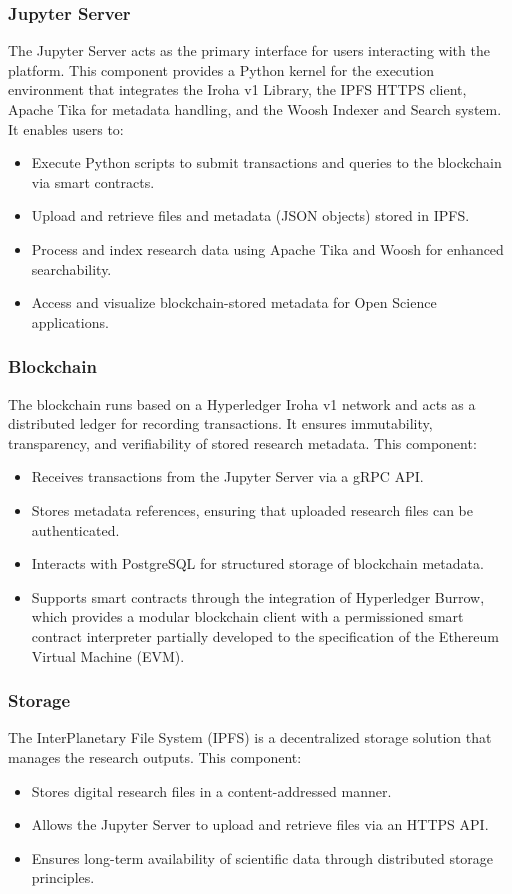 \documentclass[final]{rc-book-2.14}
\begin{document}
\subsubsection{Jupyter Server}
The Jupyter Server acts as the primary interface for users interacting with the platform. This component provides a Python kernel for the execution environment that integrates the Iroha v1 Library, the IPFS HTTPS client, Apache Tika for metadata handling, and the Woosh Indexer and Search system. It enables users to:

\begin{itemize}
    \item Execute Python scripts to submit transactions and queries to the blockchain via smart contracts.
    \item Upload and retrieve files and metadata (JSON objects) stored in IPFS.
    \item Process and index research data using Apache Tika and Woosh for enhanced searchability.
    \item Access and visualize blockchain-stored metadata for Open Science applications.
\end{itemize}

\subsubsection{Blockchain}
The blockchain runs based on a Hyperledger Iroha v1 network and acts as a distributed ledger for recording transactions. It ensures immutability, transparency, and verifiability of stored research metadata. This component:
\begin{itemize}
    \item Receives transactions from the Jupyter Server via a gRPC API.
    \item Stores metadata references, ensuring that uploaded research files can be authenticated.
    \item Interacts with PostgreSQL for structured storage of blockchain metadata.
    \item Supports smart contracts through the integration of Hyperledger Burrow, which provides a modular blockchain client with a permissioned smart contract interpreter partially developed to the specification of the Ethereum Virtual Machine (EVM).

\end{itemize}

\subsubsection{Storage}
The InterPlanetary File System (IPFS) is a decentralized storage solution that manages the research outputs. This component:
\begin{itemize}
    \item Stores digital research files in a content-addressed manner.
    \item Allows the Jupyter Server to upload and retrieve files via an HTTPS API.
    \item Ensures long-term availability of scientific data through distributed storage principles.
\end{itemize}
\end{document}
